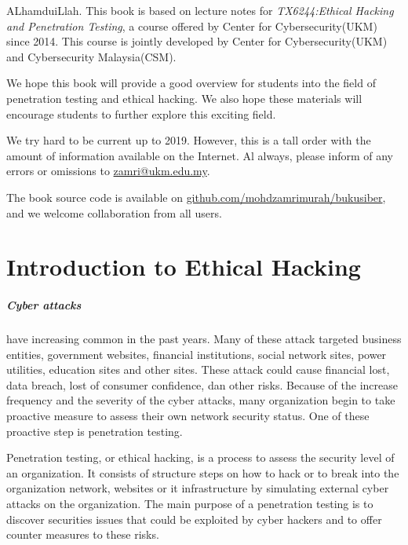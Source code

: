 \documentclass[7x9]{times}
\begin{document}
\begin{preface}

ALhamduiLlah. This book is based on lecture notes for
\textit{TX6244:Ethical Hacking and Penetration Testing}, a course
offered by Center for Cybersecurity(UKM) since 2014. This course is
jointly developed by Center for Cybersecurity(UKM) and Cybersecurity
Malaysia(CSM).

We hope this book will provide a good overview for students into the
field of penetration testing and ethical hacking. We also hope these
materials will encourage students to further explore this exciting
field.

We try hard to be current up to 2019. However, this is a tall order
with the amount of information available on the Internet. Al always,
please inform of any errors or omissions to \url{zamri@ukm.edu.my}.

The book source code is available on
\url{github.com/mohdzamrimurah/bukusiber}, and we welcome
collaboration from all users.



\end{preface}

\chapter{Introduction to Ethical Hacking}

\paragraph{Cyber attacks} have increasing common in the past years. Many of these attack
targeted business entities, government websites, financial institutions, 
social network sites, power utilities, education sites and other sites. These attack could cause financial lost, data breach, lost of consumer confidence, dan other risks. Because
of the increase frequency and the severity of the cyber attacks, many organization begin to
take proactive measure to assess their own network security status. One of these proactive
step is penetration testing.

Penetration testing, or ethical hacking, is a process to assess the security level of an organization. It consists of structure steps on how to hack or to break into the organization
network, websites or it infrastructure by simulating external cyber attacks on the 
organization. The main purpose of a penetration testing is to discover securities issues
that could be exploited by cyber hackers and to offer counter measures to these risks.
\end{document}
